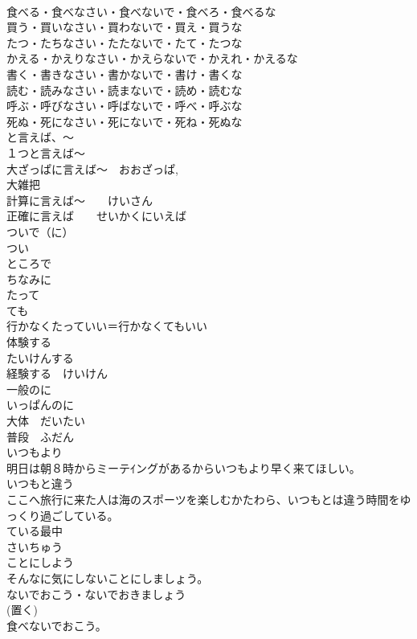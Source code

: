 \documentclass[8pt]{extreport}
\begin{document}
\begin{CJK}{UTF8}{min}
\\	食べる・食べなさい・食べないで・食べろ・食べるな
\\	買う・買いなさい・買わないで・買え・買うな
\\	たつ・たちなさい・たたないで・たて・たつな
\\	かえる・かえりなさい・かえらないで・かえれ・かえるな
\\	書く・書きなさい・書かないで・書け・書くな
\\	読む・読みなさい・読まないで・読め・読むな
\\	呼ぶ・呼びなさい・呼ばないで・呼べ・呼ぶな
\\	死ぬ・死になさい・死にないで・死ね・死ぬな
\\	と言えば、～
\\	１つと言えば～
\\	大ざっぱに言えば～　おおざっぱ, 
\\	大雑把
\\	計算に言えば～　　けいさん
\\	正確に言えば　　せいかくにいえば
\\	ついで（に）
\\	つい 
\\	ところで
\\	ちなみに
\\	たって
\\	ても 
\\	行かなくたっていい＝行かなくてもいい	
\\	体験する
\\	たいけんする
\\	経験する　けいけん
\\	一般のに
\\	いっぱんのに
\\	大体　だいたい
\\	普段　ふだん
\\	いつもより
\\	明日は朝８時からミーテｲングがあるからいつもより早く来てほしい。
\\	いつもと違う
\\	ここへ旅行に来た人は海のスポーツを楽しむかたわら、いつもとは違う時間をゆっくり過ごしている。
\\	ている最中
\\	さいちゅう
\\	ことにしよう
\\	そんなに気にしないことにしましょう。
\\	ないでおこう・ないでおきましょう
\\	(置く)
\\	食べないでおこう。

\end{CJK}
\end{document}
